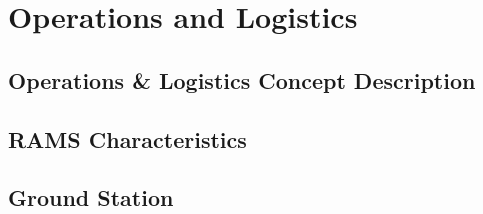\chapter{Operations and Logistics}
\setlength{\parindent}{15pt}
\label{ch:oper_logi}

\section{Operations \& Logistics Concept Description}
\label{sec:oper_logi_conc_desc}

\section{RAMS Characteristics}
\label{sec:rams_char}

\section{Ground Station}
\label{grou_stat}

